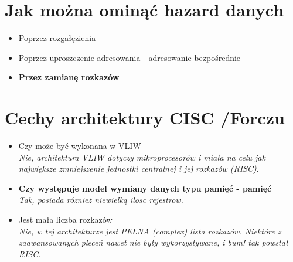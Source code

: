 \documentclass[a4paper,twoside]{article}
\begin{document}
\section{Jak można ominąć hazard danych}
	\begin{itemize}
    \item Poprzez rozgałęzienia
    \item Poprzez uproszczenie adresowania - adresowanie bezpośrednie
    \item \textbf{Przez zamianę rozkazów}
    \end{itemize}

\section{Cechy architektury CISC {\small /Forczu}}
	\begin{itemize}
    \item Czy może być wykonana w VLIW\\
    {\small \emph{Nie, architektura VLIW dotyczy mikroprocesorów i miała na celu jak największe zmniejszenie jednostki centralnej i jej rozkazów (RISC)}. }
    \item \textbf{Czy występuje model wymiany danych typu pamięć - pamięć}\\
    {\small \emph{Tak, posiada róznież niewielką ilosc rejestrow.}}
    \item Jest mała liczba rozkazów\\
    {\small \emph{Nie, w tej architekturze jest PEŁNA (complex) lista rozkazów. Niektóre z zaawansowanych pleceń nawet nie były wykorzystywane, i bum! tak powstał RISC.}}
    \end{itemize}
\end{document}
